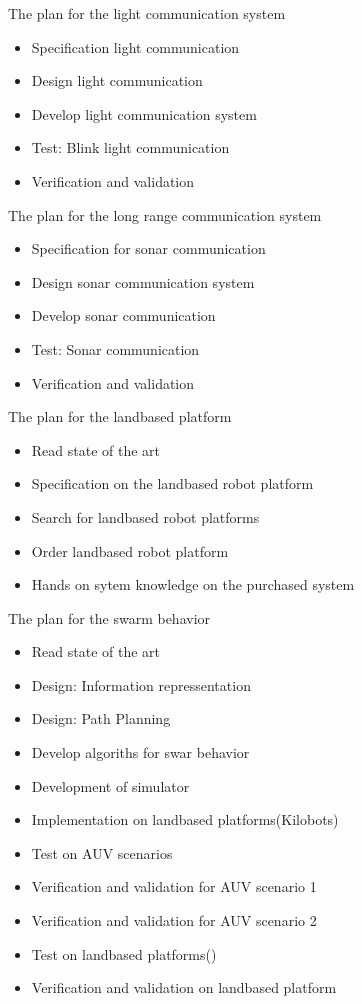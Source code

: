 \documentclass[cleardoublepage=plain]{scrartcl}
\begin{document}
The plan for the light communication system
\begin{itemize}
\item Specification light communication
\item Design light communication
\item Develop light communication system
\item Test: Blink light communication
\item Verification and validation
\end{itemize}

The plan for the long range communication system
\begin{itemize}
\item Specification for sonar communication
\item Design sonar communication system
\item Develop sonar communication
\item Test: Sonar communication
\item Verification and validation
\end{itemize}

The plan for the landbased platform
\begin{itemize}
\item Read state of the art
\item Specification on the landbased robot platform
\item Search for landbased robot platforms
\item Order landbased robot platform
\item Hands on sytem knowledge on the purchased system
\end{itemize}

The plan for the swarm behavior
\begin{itemize}
\item Read state of the art
\item Design: Information repressentation
\item Design: Path Planning
\item Develop algoriths for swar behavior
\item Development of simulator
\item Implementation on landbased platforms(Kilobots)
\item Test on AUV scenarios
\item Verification and validation for AUV scenario 1
\item Verification and validation for AUV scenario 2
\item Test on landbased platforms()
\item Verification and validation on landbased platform
\end{itemize}
\end{document}

